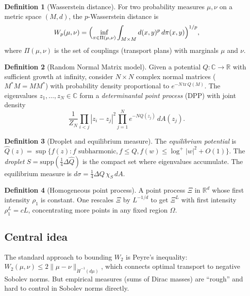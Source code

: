 \documentclass[11pt,a4paper]{article}
\theoremstyle{definition}
\newtheorem{definition}{Definition}
\begin{document}
\begin{definition}[Wasserstein distance]
For two probability measures $\mu,\nu$ on a metric space $(M,d)$, the $p$-Wasserstein distance is
\[
W_p(\mu,\nu) = \Bigl(\inf_{\pi\in\Pi(\mu,\nu)}\int_{M\times M}d(x,y)^p\,d\pi(x,y)\Bigr)^{1/p},
\]
where $\Pi(\mu,\nu)$ is the set of couplings (transport plans) with marginals $\mu$ and $\nu$.
\end{definition}

\begin{definition}[Random Normal Matrix model]
Given a potential $Q:\mathbb{C}\to\mathbb{R}$ with sufficient growth at infinity, consider $N\times N$ complex normal matrices ($M^*M=MM^*$) with probability density proportional to $e^{-N\,\mathrm{tr}\,Q(M)}$. The eigenvalues $z_1,\dots,z_N\in\mathbb{C}$ form a \emph{determinantal point process} (DPP) with joint density
\[
\frac{1}{Z_N}\prod_{i<j}|z_i-z_j|^2\prod_{j=1}^N e^{-NQ(z_j)}\,dA(z_j).
\]
\end{definition}

\begin{definition}[Droplet and equilibrium measure]
The \emph{equilibrium potential} is $\hat{Q}(z)=\sup\{f(z): f \text{ subharmonic}, f\le Q, f(w)\le\log^+|w|^2+O(1)\}$. The \emph{droplet} $S=\mathrm{supp}(\frac{1}{4}\Delta\hat{Q})$ is the compact set where eigenvalues accumulate. The equilibrium measure is $d\sigma = \frac{1}{4}\Delta Q\,\chi_S\,dA$.
\end{definition}

\begin{definition}[Homogeneous point process]
A point process $\Xi$ in $\mathbb{R}^d$ whose first intensity $\rho_1$ is constant. One rescales $\Xi$ by $L^{-1/d}$ to get $\Xi^L$ with first intensity $\rho_1^L = cL$, concentrating more points in any fixed region $\Omega$.
\end{definition}

\subsection*{Central idea}

The standard approach to bounding $W_2$ is Peyre's inequality: $W_2(\mu,\nu)\le 2\|\mu-\nu\|_{\dot{H}^{-1}(d\mu)}$, which connects optimal transport to negative Sobolev norms. But empirical measures (sums of Dirac masses) are ``rough'' and hard to control in Sobolev norms directly.
\end{document}
